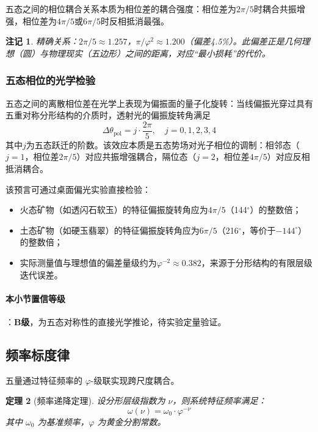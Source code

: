 \documentclass[12pt,a4paper,twocolumn]{article}
\renewcommand{\phi}{\varphi}
\newtheorem{theorem}{定理}[section]
\newtheorem{remark}[theorem]{注记}
\begin{document}
五态之间的相位耦合关系本质为相位差的耦合强度：相位差为$2\pi/5$时耦合共振增强，相位差为$4\pi/5$或$6\pi/5$时反相抵消最强。

\begin{remark}
精确关系：$2\pi/5 \approx 1.257$，$\pi/\phi^2 \approx 1.200$（偏差4.5\%）。此偏差正是几何理想（圆）与物理现实（五边形）之间的距离，对应``最小损耗''的代价。
\end{remark}

\subsubsection{五态相位的光学检验}
\label{subsec:optical_test}
五态之间的离散相位差在光学上表现为偏振面的量子化旋转：当线偏振光穿过具有五重对称分形结构的介质时，透射光的偏振旋转角满足
\begin{equation}
\Delta \theta_{\text{pol}} = j \cdot \frac{2\pi}{5}, \quad j=0,1,2,3,4
\end{equation}
其中$j$为五态跃迁的阶数。该效应本质是五态势场对光子相位的调制：相邻态（$j=1$，相位差$2\pi/5$）对应共振增强耦合，隔位态（$j=2$，相位差$4\pi/5$）对应反相抵消耦合。

该预言可通过桌面偏光实验直接检验：
\begin{itemize}
\item 火态矿物（如透闪石软玉）的特征偏振旋转角应为$4\pi/5$（144$^\circ$）的整数倍；
\item 土态矿物（如硬玉翡翠）的特征偏振旋转角应为$6\pi/5$（216$^\circ$，等价于$-144^\circ$）的整数倍；
\item 实际测量值与理想值的偏差量级约为$\phi^{-2} \approx 0.382$，来源于分形结构的有限层级迭代误差。
\end{itemize}

\paragraph{本小节置信等级}：\textbf{B级}，为五态对称性的直接光学推论，待实验定量验证。

\subsection{频率标度律}
\label{subsec:frequency}

五量通过特征频率的 $\phi$-级联实现跨尺度耦合。

\begin{theorem}[频率递降定理]
设分形层级指数为 $\nu$，则系统特征频率满足：
\begin{equation}
\omega(\nu) = \omega_0 \cdot \phi^{-\nu}
\end{equation}
其中 $\omega_0$ 为基准频率，$\phi$ 为黄金分割常数。
\end{theorem}
\end{document}
